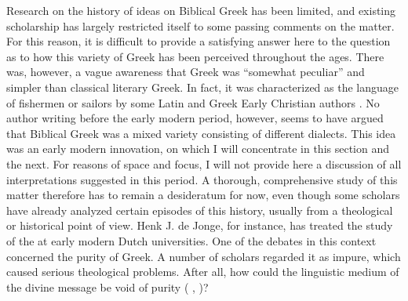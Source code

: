 Research on the history of ideas on Biblical Greek has been limited, and existing scholarship has largely restricted itself to some passing comments on the matter. For this reason, it is difficult to provide a satisfying answer here to the question as to how this variety of Greek has been perceived throughout the ages. There was, however, a vague awareness that  Greek was “somewhat peculiar” and simpler than classical literary Greek. In fact, it was characterized as the language of fishermen or sailors by some Latin and Greek Early Christian authors \citep[647]{Janse2007}. No author writing before the early modern period, however, seems to have argued that Biblical Greek was a mixed variety consisting of different dialects. This idea was an early modern innovation, on which I will concentrate in this section and the next. For reasons of space and focus, I will not provide here a discussion of all interpretations suggested in this period. A thorough, comprehensive study of this matter therefore has to remain a desideratum for now, even though some scholars have already analyzed certain episodes of this history, usually from a theological or historical point of view. Henk J. de Jonge, for instance, has treated the study of the  at early modern Dutch universities. One of the debates in this context concerned the purity of  Greek. A number of scholars regarded it as impure, which caused serious theological problems. After all, how could the linguistic medium of the divine message be void of purity (\citeauthor{De1980} \citeyear[35--38]{De1980}, \citeyear[117--118]{De1981})?

